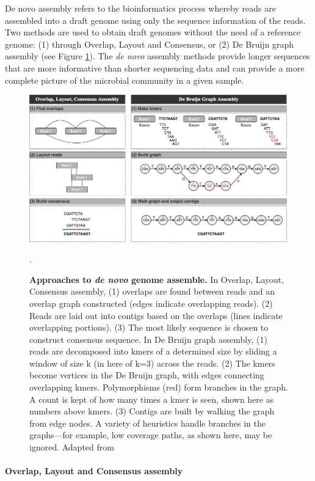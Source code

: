 De novo assembly refers to the bioinformatics process whereby reads are assembled into a draft genome using only the sequence information of the reads. Two methods are used to obtain draft genomes without the need of a reference genome: (1) through Overlap, Layout and Consensus, or (2) De Bruijn graph assembly (see Figure \ref{fig:figure8}). The \textit{de novo} assembly methods provide longer sequences that are more informative than shorter sequencing data and can provide a more complete picture of the microbial community in a given sample.

\begin{figure}[h!]
\centering
\includegraphics[width=\textwidth]{figures/introduction/Figure 8.png}
\caption{\textbf{Approaches to \textit{de novo} genome assemble.} In Overlap, Layout, Consensus assembly, (1) overlaps are found between reads and an overlap graph constructed (edges indicate overlapping reads). (2) Reads are laid out into contigs based on the overlaps (lines indicate overlapping portions). (3) The most likely sequence is chosen to construct consensus sequence. In De Bruijn graph assembly, (1) reads are decomposed into kmers of a determined size by sliding a window of size k (in here of k=3) across the reads. (2) The kmers become vertices in the De Bruijn graph, with edges connecting overlapping kmers. Polymorphisms (red) form branches in the graph. A count is kept of how many times a kmer is seen, shown here as numbers above kmers. (3) Contigs are built by walking the graph from edge nodes. A variety of heuristics handle branches in the graphs—for example, low coverage paths, as shown here, may be ignored. Adapted from \cite{ayling_new_2020}}.
\label{fig:figure8}
\end{figure}

\paragraph{Overlap, Layout and Consensus assembly} \label{sssec:OLC_assembly} \mbox\\

